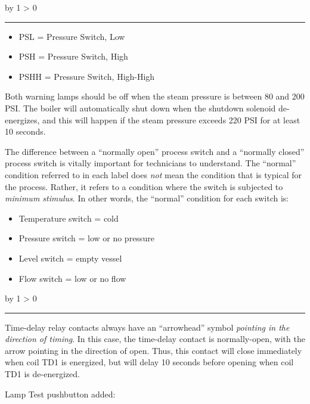 \documentclass[12pt,a4paper]{article}
\def\svar{
           \advance\answnum by 1
           \ifnum \answnum > 0
                \hrule
                \vskip 3pt
                \leftline{Svar \the\answnum}
                \vskip 3pt \fi}
\def\notes{
           \advance\explnum by 1
           \ifnum \explnum > 0
                \hrule
                \vskip 3pt
                \leftline{Notes \the\explnum}
                \vskip 3pt \fi}
\begin{document}
\vskip 10pt \filbreak 





\svar{} 

\begin{itemize}
\item{} PSL = Pressure Switch, Low
\item{} PSH = Pressure Switch, High
\item{} PSHH = Pressure Switch, High-High
\end{itemize}

Both warning lamps should be off when the steam pressure is between 80 and 200 PSI.  The boiler will automatically shut down when the shutdown solenoid de-energizes, and this will happen if the steam pressure exceeds 220 PSI for at least 10 seconds.

\vskip 10pt

The difference between a ``normally open'' process switch and a ``normally closed'' process switch is vitally important for technicians to understand.  The ``normal'' condition referred to in each label does {\it not} mean the condition that is typical for the process.  Rather, it refers to a condition where the switch is subjected to {\it minimum stimulus}.  In other words, the ``normal'' condition for each switch is:

\begin{itemize}
\item{} Temperature switch = cold
\item{} Pressure switch = low or no pressure
\item{} Level switch = empty vessel
\item{} Flow switch = low or no flow
\end{itemize}

\vskip 10pt \filbreak 





\notes{} 

Time-delay relay contacts always have an ``arrowhead'' symbol {\it pointing in the direction of timing}.  In this case, the time-delay contact is normally-open, with the arrow pointing in the direction of open.  Thus, this contact will close immediately when coil TD1 is energized, but will delay 10 seconds before opening when coil TD1 is de-energized.

\vskip 10pt

Lamp Test pushbutton added:
\end{document}
